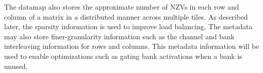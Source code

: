 The datamap also stores the  approximate number of NZVs in each row and column of a matrix in a distributed manner across multiple tiles. 
As described later, the sparsity information is used to improve load balancing.     
The metadata may also store finer-granularity information such as the channel and bank interleaving information for rows and columns. 
This metadata information will be used to enable optimizations such as gating bank activations 
when a bank is unused.    
%




 

